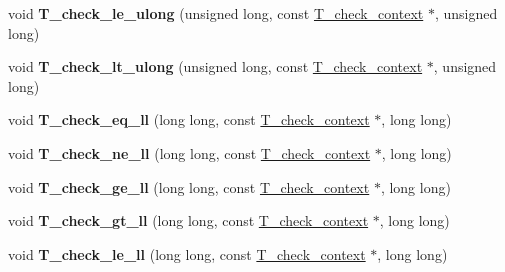 \begin{DoxyCompactItemize}
\item 
\mbox{\label{group__RTEMSTestFrameworkImpl_ga879a761ba51bbb406d6b51eb0975d16d}} 
void {\bfseries T\+\_\+check\+\_\+le\+\_\+ulong} (unsigned long, const \mbox{\hyperlink{structT__check__context}{T\+\_\+check\+\_\+context}} $\ast$, unsigned long)
\item 
\mbox{\label{group__RTEMSTestFrameworkImpl_gaa719f83c1a85cc2d1281169797f848d9}} 
void {\bfseries T\+\_\+check\+\_\+lt\+\_\+ulong} (unsigned long, const \mbox{\hyperlink{structT__check__context}{T\+\_\+check\+\_\+context}} $\ast$, unsigned long)
\item 
\mbox{\label{group__RTEMSTestFrameworkImpl_ga0946150d98131c6009562d0453ecfa3e}} 
void {\bfseries T\+\_\+check\+\_\+eq\+\_\+ll} (long long, const \mbox{\hyperlink{structT__check__context}{T\+\_\+check\+\_\+context}} $\ast$, long long)
\item 
\mbox{\label{group__RTEMSTestFrameworkImpl_ga31a8c664abbbc6bff4ed7e7db9f2ac9f}} 
void {\bfseries T\+\_\+check\+\_\+ne\+\_\+ll} (long long, const \mbox{\hyperlink{structT__check__context}{T\+\_\+check\+\_\+context}} $\ast$, long long)
\item 
\mbox{\label{group__RTEMSTestFrameworkImpl_ga937d19d3da6948d01b4ab43973ade1ef}} 
void {\bfseries T\+\_\+check\+\_\+ge\+\_\+ll} (long long, const \mbox{\hyperlink{structT__check__context}{T\+\_\+check\+\_\+context}} $\ast$, long long)
\item 
\mbox{\label{group__RTEMSTestFrameworkImpl_ga9777cc1289dd333b3a63593c8db876bf}} 
void {\bfseries T\+\_\+check\+\_\+gt\+\_\+ll} (long long, const \mbox{\hyperlink{structT__check__context}{T\+\_\+check\+\_\+context}} $\ast$, long long)
\item 
\mbox{\label{group__RTEMSTestFrameworkImpl_ga1e8d408b56993bb48edc15c3ac847cb5}} 
void {\bfseries T\+\_\+check\+\_\+le\+\_\+ll} (long long, const \mbox{\hyperlink{structT__check__context}{T\+\_\+check\+\_\+context}} $\ast$, long long)
\item 
\mbox{\label{group__RTEMSTestFrameworkImpl_ga4446cbde739ce0ea6e6a740a2cdb216e}} 

\end{DoxyCompactItemize}
